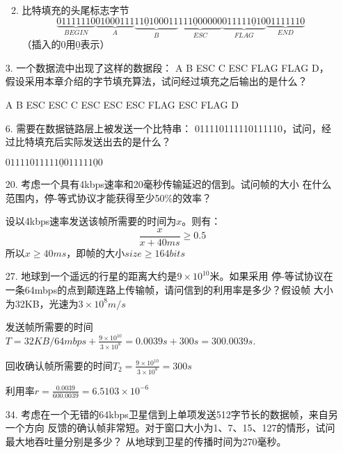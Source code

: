 \documentclass{ctexart}
\begin{document}
\begin{itemize}
\begin{enumerate}
\begin{equation*}
        \end{equation*}
        \item 比特填充的头尾标志字节
        \begin{equation*}
            \underbrace{01111110}_{BEGIN}
            \underbrace{01000111}_A
            \underbrace{11\underline{0}100011}_B
            \underbrace{111\underline{0}00000}_{ESC}
            \underbrace{011111\underline{0}10}_{FLAG}
            \underbrace{01111110}_{END}
        \end{equation*}
        （插入的$0$用$\underline{0}$表示）
    \end{enumerate}
    \item[3.] 一个数据流中出现了这样的数据段： A B ESC C ESC FLAG FLAG D，
    假设采用本章介绍的字节填充算法，试问经过填充之后输出的是什么？
    
    A B ESC ESC C ESC ESC ESC FLAG ESC FLAG D

    \item[6.] 需要在数据链路层上被发送一个比特串：
    011110111110111110，试问，经过比特填充后实际发送出去的是什么？

    $01111011111\underline{0}011111\underline{0}0$

    \item[20.] 考虑一个具有4kbps速率和20毫秒传输延迟的信到。试问帧的大小
    在什么范围内，停-等式协议才能获得至少50\%的效率？

    设以4kbps速率发送该帧所需要的时间为$x$。则有：
    \begin{equation*}
        \frac{x}{x + 40ms} \geq 0.5
    \end{equation*}
    所以$x \geq 40ms$，即帧的大小$size \geq 164 bits$

    \item[27.] 地球到一个遥远的行星的距离大约是$9\times10^{10}$米。如果采用
    停-等试协议在一条64mbps的点到颠连路上传输帧，请问信到的利用率是多少？假设帧
    大小为32KB，光速为$3 \times 10^8 m/s$

    发送帧所需要的时间$T = 32KB / 64mbps + \frac{9\times10^{10}}{3\times10^8}
    = 0.0039 s + 300s = 300.0039s.
    $

    回收确认帧所需要的时间$T_2 = \frac{9\times10^{10}}{3\times10^8} = 300s$

    利用率$r = \frac{0.0039}{600.0039} = 6.5103 \times 10^{-6}$

    \item[34.] 考虑在一个无错的64kbps卫星信到上单项发送512字节长的数据帧，来自另一个方向
    反馈的确认帧非常短。对于窗口大小为1、7、15、127的情形，试问最大地吞吐量分别是多少？
    从地球到卫星的传播时间为270毫秒。


\end{itemize}
\end{document}
